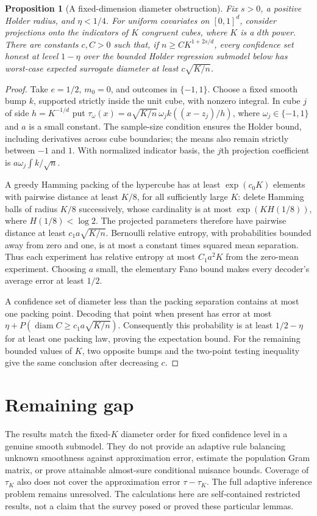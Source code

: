 \documentclass[11pt]{article}
\newtheorem{proposition}[theorem]{Proposition}
\theoremstyle{remark}
\begin{document}
\begin{proposition}[A fixed-dimension diameter obstruction]
Fix $s>0$, a positive Holder radius, and $\eta<1/4$. For uniform covariates on $[0,1]^d$, consider projections onto the indicators of $K$ congruent cubes, where $K$ is a $d$th power. There are constants $c,C>0$ such that, if $n\ge C K^{1+2s/d}$, every confidence set honest at level $1-\eta$ over the bounded Holder regression submodel below has worst-case expected surrogate diameter at least $c\sqrt{K/n}$.
\end{proposition}
\begin{proof}
Take $e=1/2$, $m_0=0$, and outcomes in $\{-1,1\}$. Choose a fixed smooth bump $k$, supported strictly inside the unit cube, with nonzero integral. In cube $j$ of side $h=K^{-1/d}$ put
$\tau_\omega(x)=a\sqrt{K/n}\,\omega_j k((x-z_j)/h)$,
where $\omega_j\in\{-1,1\}$ and $a$ is a small constant. The sample-size condition ensures the Holder bound, including derivatives across cube boundaries; the means also remain strictly between $-1$ and $1$. With normalized indicator basis, the $j$th projection coefficient is $a\omega_j\int k/\sqrt n$.

A greedy Hamming packing of the hypercube has at least $\exp(c_0K)$ elements with pairwise distance at least $K/8$, for all sufficiently large $K$: delete Hamming balls of radius $K/8$ successively, whose cardinality is at most $\exp(K H(1/8))$, where $H(1/8)<\log2$. The projected parameters therefore have pairwise distance at least $c_1a\sqrt{K/n}$. Bernoulli relative entropy, with probabilities bounded away from zero and one, is at most a constant times squared mean separation. Thus each experiment has relative entropy at most $C_1a^2K$ from the zero-mean experiment. Choosing $a$ small, the elementary Fano bound makes every decoder's average error at least $1/2$.

A confidence set of diameter less than the packing separation contains at most one packing point. Decoding that point when present has error at most $\eta+P(\operatorname{diam}C\ge c_1a\sqrt{K/n})$. Consequently this probability is at least $1/2-\eta$ for at least one packing law, proving the expectation bound. For the remaining bounded values of $K$, two opposite bumps and the two-point testing inequality give the same conclusion after decreasing $c$.
\end{proof}

\section*{Remaining gap}
The results match the fixed-$K$ diameter order for fixed confidence level in a genuine smooth submodel. They do not provide an adaptive rule balancing unknown smoothness against approximation error, estimate the population Gram matrix, or prove attainable almost-sure conditional nuisance bounds. Coverage of $\tau_K$ also does not cover the approximation error $\tau-\tau_K$. The full adaptive inference problem remains unresolved. The calculations here are self-contained restricted results, not a claim that the survey posed or proved these particular lemmas.
\end{document}
